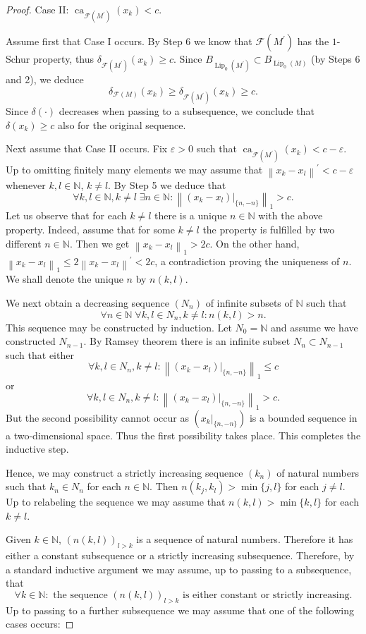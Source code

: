 \documentclass{amsart}
\numberwithin{equation}{section}
\theoremstyle{definition}
\def\F{\mathcal F}
\def\ep{\varepsilon}
\def\en{\mathbb N}
\def \Lip {\operatorname{Lip}}
\def\de#1{\delta\left(#1\right)}
\newcommand{\norm}[1]{\left\|#1\right\|}
\newcommand{\ca}[2][]{\operatorname{ca}_{#1}\left(#2\right)}
\begin{document}
\begin{proof}
Case II: $\ca[\F(M^\prime)]{x_k}<c$.


Assume first that Case I occurs. By Step 6 we know that $\F(M^\prime)$ has the $1$-Schur property, thus $\delta_{\F(M^\prime)}(x_k)\ge c$. Since $B_{\Lip_0(M^\prime)}\subset B_{\Lip_0(M)}$ (by Steps 6 and 2), we deduce
$$\delta_{\F(M)}(x_k)\ge \delta_{\F(M^\prime)}(x_k)\ge c.$$
Since $\de{\cdot}$ decreases when passing to a subsequence, we conclude that $\de{x_k}\ge c$ also for the original sequence.

Next assume that Case II occurs. Fix $\ep>0$ such that $\ca[\F(M^\prime)]{x_k}<c-\ep$. Up to omitting finitely many elements we may assume that $\norm{x_k-x_l}^\prime<c-\ep$ whenever $k,l\in\en$, $k\ne l$. 
By Step 5 we deduce that
$$\forall k,l\in\en, k\ne l\;\exists n\in\en \colon \norm{(x_k-x_l)|_{\{n,-n\}}}_1>c.$$
Let us observe that for each $k\ne l$ there is a unique $n\in\en$ with the above property. Indeed, assume that for some $k\ne l$ the property is fulfilled by two different $n\in\en$. Then we get $\norm{x_k-x_l}_1>2c$. On the other hand, $\norm{x_k-x_l}_1\le 2\norm{x_k-x_l}^\prime< 2c$, a contradiction proving the uniqueness of $n$. We shall  denote the unique $n$ by $n(k,l)$.

We next obtain a decreasing sequence $(N_n)$ of infinite subsets of $\en$ such that
$$\forall n\in\en\;\forall k,l\in N_n, k\ne l\colon n(k,l)>n.$$
This sequence may be constructed by induction. Let $N_0=\en$ and assume we have constructed $N_{n-1}$.
By Ramsey theorem there is an infinite subset $N_n\subset N_{n-1}$ such that
either
$$\forall k,l\in N_n, k\ne l\colon \norm{(x_k-x_l)|_{\{n,-n\}}}_1\le c$$
or
$$\forall k,l\in N_n, k\ne l\colon \norm{(x_k-x_l)|_{\{n,-n\}}}_1> c.$$
But the second possibility cannot occur as $(x_k|_{\{n,-n\}})$ is a bounded sequence in a two-dimensional space.
Thus the first possibility takes place. This completes the inductive step.

Hence, we may construct a strictly increasing sequence $(k_n)$ of natural numbers such that $k_n\in N_n$ for each $n\in\en$.
Then $n(k_j,k_l)>\min\{j,l\}$ for each $j\ne l$. Up to relabeling the sequence we may assume that
$n(k,l)>\min\{k,l\}$ for each $k\ne l$.

Given $k\in\en$, $(n(k,l))_{l>k}$ is a sequence of natural numbers. Therefore it has either a constant subsequence or a strictly increasing subsequence. Therefore, by a standard inductive argument we may assume, up to passing to a subsequence, that
$$\forall k\in \en\colon \mbox{ the sequence $(n(k,l))_{l>k}$ is either constant or strictly increasing}.$$
Up to passing to a further subsequence we may assume that one of the following cases occurs:


\end{proof}
\end{document}
